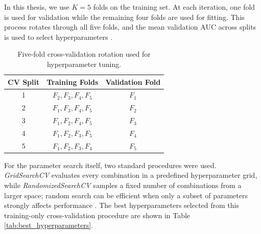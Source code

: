 \documentclass[11pt]{amsart}
\theoremstyle{definition}                  %
\theoremstyle{remark}                       %
\numberwithin{equation}{section}
\begin{document}
In this thesis, we use $K=5$ folds on the training set. At each iteration, one fold is used for validation while the remaining four folds are used for fitting. This process rotates through all five folds, and the mean validation AUC across splits is used to select hyperparameters \cite{fawcett2006introduction}.
\begin{table}[h!]
\centering
\small
\begin{tabular}{c c c}
\toprule
\textbf{CV Split} & \textbf{Training Folds} & \textbf{Validation Fold} \\
\midrule
1 & $F_2,F_3,F_4,F_5$ & $F_1$ \\
2 & $F_1,F_3,F_4,F_5$ & $F_2$ \\
3 & $F_1,F_2,F_4,F_5$ & $F_3$ \\
4 & $F_1,F_2,F_3,F_5$ & $F_4$ \\
5 & $F_1,F_2,F_3,F_4$ & $F_5$ \\
\bottomrule
\end{tabular}
\caption{Five-fold cross-validation rotation used for hyperparameter tuning.}
\label{tab:kfold_cv_scheme}
\end{table}
\FloatBarrier
For the parameter search itself, two standard procedures were used. \textit{GridSearchCV} evaluates every combination in a predefined hyperparameter grid, while \textit{RandomizedSearchCV} samples a fixed number of combinations from a larger space; random search can be efficient when only a subset of parameters strongly affects performance \cite{bergstra2012random, pedregosa2011scikit}. The best hyperparameters selected from this training-only cross-validation procedure are shown in Table \ref{tab:best_hyperparameters}.
\end{document}
